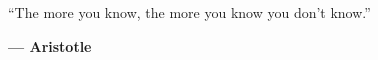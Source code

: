\begin{center}
	“The more you know,
	the more you know you don't know.”

	\vspace{1cm}
	\textbf{— Aristotle}
\end{center}

\newpage{}


